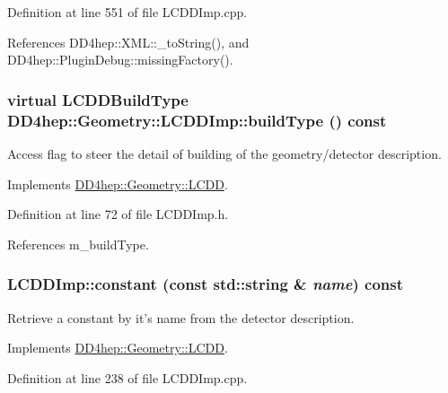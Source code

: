 Definition at line 551 of file LCDDImp.cpp.

References DD4hep::XML::\_\-toString(), and DD4hep::PluginDebug::missingFactory().\hypertarget{class_d_d4hep_1_1_geometry_1_1_l_c_d_d_imp_ab38d01be5ddf4db043ea23a77b04a21a}{
\subsubsection[{buildType}]{\setlength{\rightskip}{0pt plus 5cm}virtual {\bf LCDDBuildType} DD4hep::Geometry::LCDDImp::buildType () const}}
\label{class_d_d4hep_1_1_geometry_1_1_l_c_d_d_imp_ab38d01be5ddf4db043ea23a77b04a21a}


Access flag to steer the detail of building of the geometry/detector description. 

Implements \hyperlink{class_d_d4hep_1_1_geometry_1_1_l_c_d_d_a73400f14f6384e1c84470595fc3667fd}{DD4hep::Geometry::LCDD}.

Definition at line 72 of file LCDDImp.h.

References m\_\-buildType.\hypertarget{class_d_d4hep_1_1_geometry_1_1_l_c_d_d_imp_aa67202d22d5ce08316bbbc6f7b00fa1c}{
\subsubsection[{constant}]{ LCDDImp::constant (const std::string \& {\em name}) const}}
\label{class_d_d4hep_1_1_geometry_1_1_l_c_d_d_imp_aa67202d22d5ce08316bbbc6f7b00fa1c}


Retrieve a constant by it's name from the detector description. 

Implements \hyperlink{class_d_d4hep_1_1_geometry_1_1_l_c_d_d_a636bc57de8b0334a83c52ef2b43c465d}{DD4hep::Geometry::LCDD}.

Definition at line 238 of file LCDDImp.cpp.

